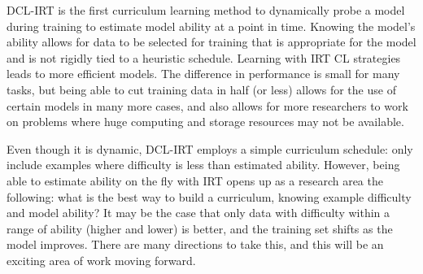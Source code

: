 \documentclass[letterpaper]{article} %
\begin{document}
DCL-IRT is the first curriculum learning method to dynamically probe a model during training to estimate model ability at a point in time.
Knowing the model's ability allows for data to be selected for training that is appropriate for the model and is not rigidly tied to a heuristic schedule.
Learning with IRT CL strategies leads to more efficient models.
The difference in performance is small for many tasks, but being able to cut training data in half (or less) allows for the use of certain models in many more cases, and also allows for more researchers to work on problems where huge computing and storage resources may not be available.

Even though it is dynamic, DCL-IRT employs a simple curriculum schedule: only include examples where difficulty is less than estimated ability.
However, being able to estimate ability on the fly with IRT opens up as a research area the following: what is the best way to build a curriculum, knowing example difficulty and model ability?
It may be the case that only data with difficulty within a range of ability (higher and lower) is better, and the training set shifts as the model improves.
There are many directions to take this, and this will be an exciting area of work moving forward.



\end{document}
